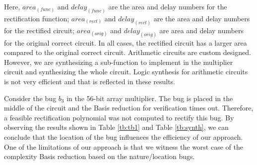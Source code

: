 Here, $area_{(func)}$ and $delay_{(func)}$ are the area and delay
numbers for the rectification function; $area_{(rect)}$ and
$delay_{(rect)}$ are the area and delay numbers for the rectified
circuit; $area_{(orig)}$ and $delay_{(orig)}$ are area and delay
numbers for the original correct circuit. In all cases, the
rectified circuit has a larger area compared to the original correct
circuit. Arithmetic circuits are custom designed. However, we are
synthesizing a sub-function to implement in the multiplier circuit and
synthesizing the whole circuit. Logic synthesis for arithmetic
circuits is not very efficient and that is reflected in these results.  

Consider the bug $b_3$ in the 56-bit array multiplier. The bug is
placed in the middle of the circuit and the \Grobner Basis reduction
for verification times out. Therefore, a feasible rectification
polynomial was not computed to rectify this bug. By observing the
results shown in Table \ref{tb:tb1} and Table \ref{tb:synth}, we can
conclude that the location of the bug influences the efficiency of our
approach. One of the limitations of our approach is that we witness
the worst case of the complexity \Grobner Basis reduction based on
the nature/location bugs. 
%




